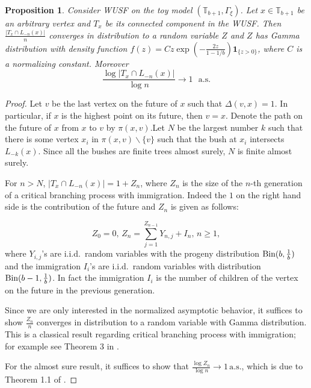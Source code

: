 \documentclass[12pt]{article}
\newtheorem{proposition}[theorem]{Proposition}
\numberwithin{equation}{section}
\def\as {\mathrm{a.s.}}
\newcommand{\1}{\mathbf{1}}
\begin{document}
 \begin{proposition}\label{prop: asymptotic for toy model}
 	Consider WUSF on the toy model $(\mathbb{T}_{b+1},\Gamma_{\xi})$. Let $x\in \mathbb{T}_{b+1}$ be an arbitrary vertex and $T_x$ be its connected component in the WUSF. 
 	Then $	\frac{|T_x\cap L_{-n}(x)|}{n} $ converges in distribution to a random variable $Z$ and $Z$ has Gamma distribution with density function $f(z)=Cz\exp(-\frac{2z}{1-1/b})\mathbf{1}_{ \{z>0\}}$, where $C$ is a normalizing constant. Moreover
 	\[
 	\frac{\log |T_x\cap L_{-n}(x)|}{\log n} \rightarrow 1\, \, \, \,  \as
 	\]
 	
 \end{proposition}
 \begin{proof}
 	Let $v$ be the last vertex on the future of $x$ such that $\Delta(v,x)=1$. In particular, if $x$ is the highest point on its future, then $v=x$. Denote the path on the future of $x$ from $x$ to $v$ by $\pi(x,v). $Let $N$ be the largest number $k$ such that there is some vertex $x_i$ in $\pi(x,v)\backslash\{v\}$ such that the bush at $x_i$ intersects $L_{-k}(x)$. 
 	Since all the bushes are finite trees almost surely, $N$ is finite almost surely. 
 	
 	For $n>N$, $|T_x\cap L_{-n}(x)|=1+Z_n$, where $Z_n$ is the size of the $n$-th generation of a critical branching process with immigration. Indeed the $1$ on the right hand side is the contribution of the future and  $Z_n$ is given as follows:
 	
 	\[
 	Z_0=0,\,  Z_n=\sum_{j=1}^{Z_{n-1}}Y_{n,j}+I_n,\, n\geq 1,
 	\]
 	where $Y_{i,j}$'s are i.i.d.\ random variables with the progeny distribution $\textnormal{Bin}(b,\frac{1}{b})$ and the immigration $I_i$'s  are i.i.d.\ random variables with distribution $\textnormal{Bin}(b-1,\frac{1}{b})$. In fact the immigration $I_i$ is the number of children of the vertex on the future in the previous generation. 
 	
 	Since we are only interested in the normalized asymptotic behavior, it suffices to show 
 	$\frac{Z_n}{n}$ converges in distribution to a random variable with Gamma distribution. This is a classical result regarding critical branching process with immigration; for example see Theorem 3 in \cite{Pakes1971}.
 	
 	For the almost sure result, it suffices to show that $\frac{\log Z_n}{\log n}\rightarrow1\,\as$, which is due to Theorem 1.1 of \cite{Wei1991}.  
 \end{proof}
 
 
 
\end{document}
